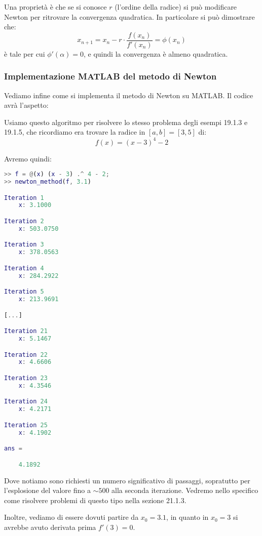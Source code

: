 \documentclass[a4paper,11pt]{article}
\begin{document}
Una proprietà è che se si conosce $r$ (l'ordine della radice) si può modificare Newton per ritrovare la convergenza quadratica.
In particolare si può dimostrare che:
$$
x_{n + 1} = x_n - r \cdot \frac{f(x_n)}{f'(x_n)} = \phi(x_n)
$$
è tale per cui $\phi'(\alpha) = 0$, e quindi la convergenza è almeno quadratica.

\subsubsection{Implementazione MATLAB del metodo di Newton}
Vediamo infine come si implementa il metodo di Newton su MATLAB.
Il codice avrà l'aspetto:
\lstset{style=codestyle, language=MATLAB}


\par\smallskip

Usiamo questo algoritmo per risolvere lo stesso problema degli esempi 19.1.3 e 19.1.5, che ricordiamo era trovare la radice in $[a, b] = [3, 5]$ di:
$$
f\left(x\right)=\left(x-3\right)^{4}-2
$$

Avremo quindi:
\begin{lstlisting}[language=MATLAB, style=codestyle]	
>> f = @(x) (x - 3) .^ 4 - 2;
>> newton_method(f, 3.1)

Iteration 1
	x: 3.1000

Iteration 2
	x: 503.0750

Iteration 3
	x: 378.0563

Iteration 4
	x: 284.2922

Iteration 5
	x: 213.9691

[...]

Iteration 21
	x: 5.1467

Iteration 22
	x: 4.6606

Iteration 23
	x: 4.3546

Iteration 24
	x: 4.2171

Iteration 25
	x: 4.1902

ans =

    4.1892
\end{lstlisting}

Dove notiamo sono richiesti un numero significativo di passaggi, sopratutto per l'esplosione del valore fino a $\sim 500$ alla seconda iterazione.
Vedremo nello specifico come risolvere problemi di questo tipo nella sezione 21.1.3.

Inoltre, vediamo di essere dovuti partire da $x_0 = 3.1$, in quanto in $x_0 = 3$ si avrebbe avuto derivata prima $f'(3) = 0$.
\end{document}
